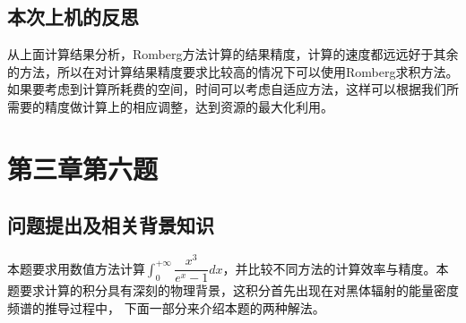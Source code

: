 \documentclass{ctexart}
\begin{document}
\subsection{本次上机的反思}
从上面计算结果分析，Romberg方法计算的结果精度，计算的速度都远远好于其余的方法，所以在对计算结果精度要求比较高的情况下可以使用Romberg求积方法。如果要考虑到计算所耗费的空间，时间可以考虑自适应方法，这样可以根据我们所需要的精度做计算上的相应调整，达到资源的最大化利用。
\section{第三章第六题}
\subsection{问题提出及相关背景知识}
本题要求用数值方法计算$\int_{0}^{+\infty}\dfrac{x^3}{e^x-1}dx$，并比较不同方法的计算效率与精度。本题要求计算的积分具有深刻的物理背景，这积分首先出现在对黑体辐射的能量密度频谱的推导过程中，
下面一部分来介绍本题的两种解法。
\end{document}
